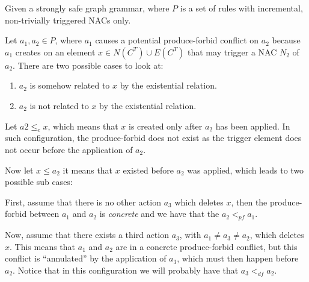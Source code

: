 \begin{definition} Given \doublyTypedGraphGrammarCore{} a strongly safe graph grammar, where $P$ is a set of rules with incremental, non-trivially triggered NACs only.

\hfill

  Let $a_1,a_2 \in P$, where $a_1$ causes a potential produce-forbid conflict on $a_2$ because $a_1$ creates on an element $x \in N(C^T) \cup E(C^T)$ that may trigger a NAC $N_2$ of $a_2$. There are two possible cases to look at:

  \begin{enumerate}
    \item $a_2$ is somehow related to $x$ by the existential relation.
    \item $a_2$ is not related to $x$ by the existential relation.
  \end{enumerate}

\begin{description}[style=nextline]
  \item[Related element:]
  Let $a2 \leq_e x$, which means that $x$ is created only after $a_2$ has been applied. In such configuration, the produce-forbid does not exist as the trigger element does not occur before the application of $a_2$. 
    
  Now let $x \leq a_2$ it means that $x$ existed before $a_2$ was applied, which leads to two possible sub cases: 
  
  First, assume that there is no other action $a_3$ which deletes $x$, then the produce-forbid between $a_1$ and $a_2$ is \emph{concrete} and we have that the $a_2 <_{pf} a_1$.

    Now, assume that there exists a third action $a_3$, with $a_1 \ne a_3 \ne a_2$, which deletes $x$. This means that $a_1$ and $a_2$ are in a concrete produce-forbid conflict, but this conflict is ``annulated'' by the application of $a_3$, which must then happen before $a_2$. Notice that in this configuration we will probably have that $a_3 <_{df} a_2$.


\end{description}
\end{definition}

